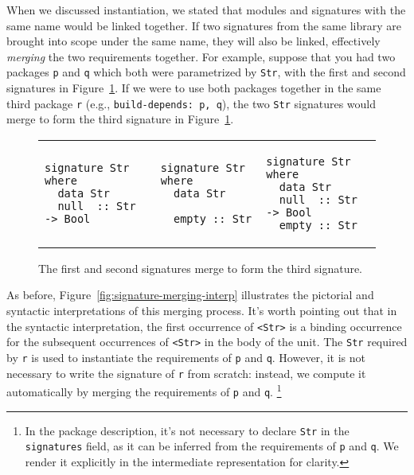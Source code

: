 When we discussed instantiation, we stated that modules and signatures
with the same name would be linked together.  If two signatures from the
same library are brought into scope under the same name, they will also
be linked, effectively \emph{merging} the two requirements together.
For example, suppose that you had two packages \verb|p| and \verb|q|
which both were parametrized by \verb|Str|, with the first and second
signatures in Figure~\ref{fig:signature-merging}.  If we were to use
both packages together in the same third package \verb|r| (e.g.,
\verb|build-depends: p, q|), the two \verb|Str| signatures would merge
to form the third signature in Figure~\ref{fig:signature-merging}.

\begin{figure}
\begin{tabular}{p{} p{} p{}}
\begin{lstlisting}
signature Str where
  data Str
  null  :: Str -> Bool
\end{lstlisting}
&
\begin{lstlisting}
signature Str where
  data Str

  empty :: Str
\end{lstlisting}
&
\begin{lstlisting}
signature Str where
  data Str
  null  :: Str -> Bool
  empty :: Str
\end{lstlisting}
\end{tabular}
\caption{The first and second signatures merge to form the third signature.}
\label{fig:signature-merging}
\end{figure}

As before, Figure~\ref{fig:signature-merging-interp} illustrates the
pictorial and syntactic interpretations of this merging process.  It's
worth pointing out that in the syntactic interpretation, the first
occurrence of \verb|<Str>| is a binding occurrence for the subsequent
occurrences of \verb|<Str>| in the body of the unit.  The
\verb|Str| required by \verb|r| is used to instantiate the requirements
of \verb|p| and \verb|q|. However, it is not necessary to write the
signature of \verb|r| from scratch: instead, we compute it automatically
by merging the requirements of \verb|p| and \verb|q|.%
%
\footnote{In the package description, it's not necessary to declare \texttt{Str}
in the \texttt{signatures} field, as it can be inferred from the requirements
of \texttt{p} and \texttt{q}.  We render it explicitly in the intermediate
representation for clarity.}

